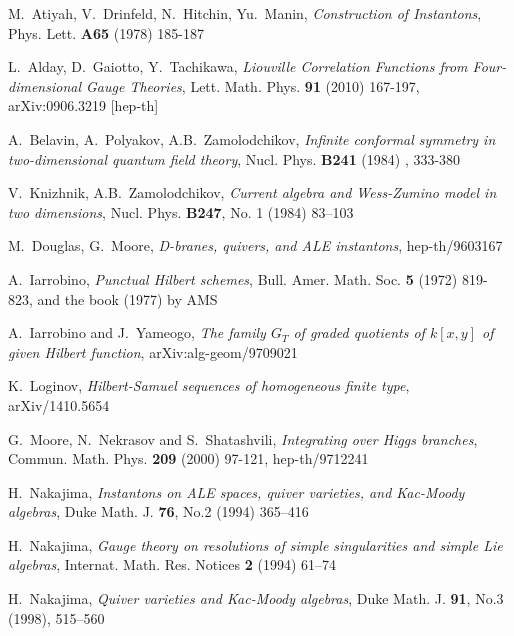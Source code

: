 \documentclass[12pt]{amsart}
\newcommand {\3}{\underline{\bf 3}}
\newcommand {\4}{\underline{\bf 4}}
\newcommand {\6}{\underline{\bf 6}}
\begin{document}
\begin{thebibliography}{KLLSW}
M.~Atiyah, V.~Drinfeld, N.~Hitchin, Yu.~Manin, \emph{Construction of Instantons}, Phys. Lett. {\bf A65} (1978) 185-187


L.~Alday, D.~Gaiotto, Y.~Tachikawa, \emph{Liouville Correlation Functions from Four-dimensional
                  Gauge Theories}, 
Lett. Math. Phys. {\bf 91} (2010) 167-197, arXiv:0906.3219 [hep-th]


A.~Belavin, A.~Polyakov, A.B.~Zamolodchikov, \emph{Infinite conformal symmetry in two-dimensional quantum
                  field theory}, Nucl. Phys. {\bf B241} (1984) , 333-380


V.~Knizhnik, A.B.~Zamolodchikov, \emph{Current algebra and Wess-Zumino model in two dimensions}, Nucl. Phys. {\bf B247}, No. 1 (1984) 
83--103

M.~Douglas, G.~Moore, \emph{D-branes, quivers, and ALE instantons}, 
hep-th/9603167


A.~Iarrobino, \emph{Punctual Hilbert schemes}, Bull. Amer. Math. Soc. {\bf 5} (1972) 819-823, and the book (1977) by AMS



A.~Iarrobino and J.~Yameogo, \emph{The family $G_{T}$ of graded quotients of $k[x,y]$ of given Hilbert function}, arXiv:alg-geom/9709021

K.~Loginov, \emph{Hilbert-Samuel sequences of homogeneous finite type},
arXiv/1410.5654

G.~Moore, N.~Nekrasov and S.~Shatashvili, \emph{Integrating over Higgs branches},
 Commun. Math. Phys. {\bf 209} (2000) 97-121,
hep-th/9712241
     
     
H.~Nakajima, \emph{Instantons on ALE spaces, quiver varieties, and
              Kac-Moody algebras}, Duke Math. J. {\bf 76}, No.2 (1994) 
 365--416
     
     
H.~Nakajima, \emph{
Gauge theory on resolutions of simple singularities and simple
              Lie algebras},
Internat. Math. Res. Notices {\bf 2} (1994) 61--74   
     
H.~Nakajima, \emph{Quiver varieties and Kac-Moody algebras},
Duke Math. J. {\bf 91}, No.3 (1998), 
515--560


\end{thebibliography}
\end{document}
